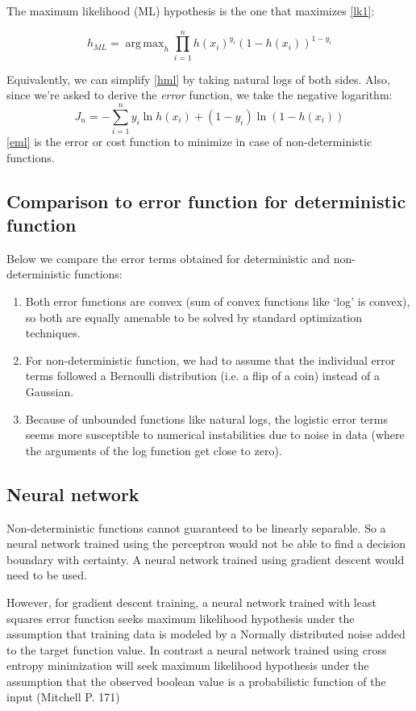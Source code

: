 \documentclass[10pt,letterpaper]{article}
\DeclareMathOperator*{\argmax}{arg\,max}
\begin{document}
The maximum likelihood (ML) hypothesis is the one that maximizes \eqref{lk1}:

\begin{equation}
\label{hml}
 h_{ML} = \argmax_{h} \prod_{i=1}^{n} h(x_i)^{y_i}(1-h(x_i))^{1-y_i}
\end{equation}

Equivalently, we can simplify \eqref{hml} by taking natural logs of both sides. Also, since we're asked to derive the {\em error} function, we take the negative logarithm:
\begin{equation}
\label{eml}
\boxed{J_n = - \sum_{i=1}^{n} y_i \ln h(x_i) + (1-y_i) \ln(1-h(x_i))}
\end{equation}
\eqref{eml} is the error or cost function to minimize in case of non-deterministic functions. 

\subsection{Comparison to error function for deterministic function}
Below we compare the error terms obtained for deterministic and non-deterministic functions:
\begin{enumerate}
\item Both error functions are convex (sum of convex functions like `log' is convex), so both are equally amenable to be solved by standard optimization techniques.
\item For non-deterministic function, we had to assume that the individual error terms followed a Bernoulli distribution (i.e. a flip of a coin) instead of a Gaussian.
\item Because of unbounded functions like natural logs, the logistic error terms seems more susceptible to numerical instabilities due to noise in data (where the arguments of the log function get close to zero).
\end{enumerate}

\subsection{Neural network}
Non-deterministic functions cannot guaranteed to be linearly separable. So a neural network trained using the perceptron would not be able to find a decision boundary with certainty. A neural network trained using gradient descent would need to be used.

However, for gradient descent training, a neural network trained with least squares error function seeks maximum likelihood hypothesis under the assumption that training data is modeled by a Normally distributed noise added to the target function value. In contrast a neural network trained using cross entropy minimization will seek maximum likelihood hypothesis under the assumption that the observed boolean value is a probabilistic function of the input (Mitchell P. 171)
\end{document}
